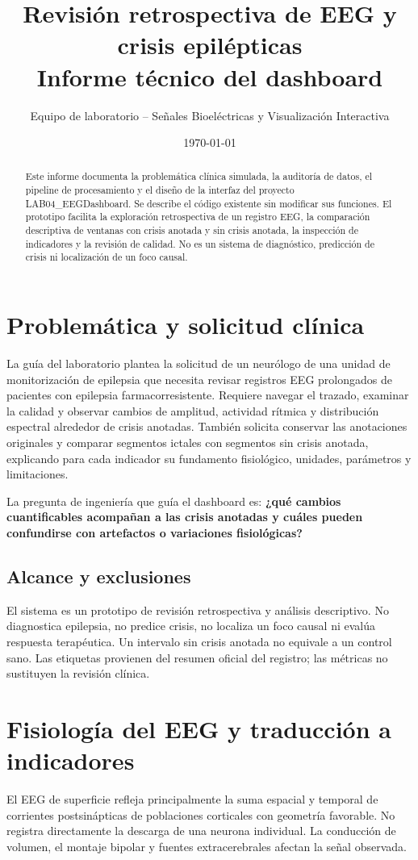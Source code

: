 \documentclass[11pt,a4paper]{article}
\title{Revisión retrospectiva de EEG y crisis epilépticas\\\large Informe técnico del dashboard}
\author{Equipo de laboratorio -- Señales Bioeléctricas y Visualización Interactiva}
\date{\today}
\begin{document}
\maketitle
\begin{abstract}
Este informe documenta la problemática clínica simulada, la auditoría de datos, el pipeline de procesamiento y el diseño de la interfaz del proyecto LAB04\_EEGDashboard. Se describe el código existente sin modificar sus funciones. El prototipo facilita la exploración retrospectiva de un registro EEG, la comparación descriptiva de ventanas con crisis anotada y sin crisis anotada, la inspección de indicadores y la revisión de calidad. No es un sistema de diagnóstico, predicción de crisis ni localización de un foco causal.
\end{abstract}
\tableofcontents
\newpage

\section{Problemática y solicitud clínica}
La guía del laboratorio plantea la solicitud de un neurólogo de una unidad de monitorización de epilepsia que necesita revisar registros EEG prolongados de pacientes con epilepsia farmacorresistente. Requiere navegar el trazado, examinar la calidad y observar cambios de amplitud, actividad rítmica y distribución espectral alrededor de crisis anotadas. También solicita conservar las anotaciones originales y comparar segmentos ictales con segmentos sin crisis anotada, explicando para cada indicador su fundamento fisiológico, unidades, parámetros y limitaciones.

La pregunta de ingeniería que guía el dashboard es: \textbf{¿qué cambios cuantificables acompañan a las crisis anotadas y cuáles pueden confundirse con artefactos o variaciones fisiológicas?}

\subsection{Alcance y exclusiones}
El sistema es un prototipo de revisión retrospectiva y análisis descriptivo. No diagnostica epilepsia, no predice crisis, no localiza un foco causal ni evalúa respuesta terapéutica. Un intervalo sin crisis anotada no equivale a un control sano. Las etiquetas provienen del resumen oficial del registro; las métricas no sustituyen la revisión clínica.

\section{Fisiología del EEG y traducción a indicadores}
El EEG de superficie refleja principalmente la suma espacial y temporal de corrientes postsinápticas de poblaciones corticales con geometría favorable. No registra directamente la descarga de una neurona individual. La conducción de volumen, el montaje bipolar y fuentes extracerebrales afectan la señal observada.
\end{document}
